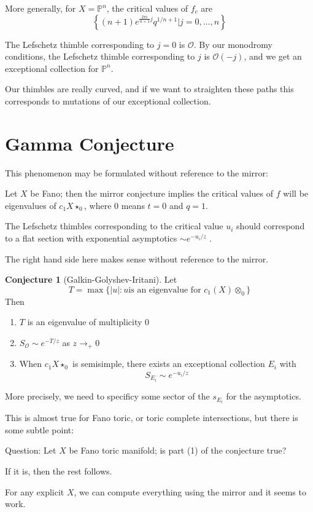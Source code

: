 \documentclass{amsart}
\theoremstyle{definition}
\newtheorem{conjecture}[dummy]{Conjecture}
\newcommand{\OO}{\mathcal{O}}
\newcommand{\proj}{\mathbb{P}}
\begin{document}
More generally, for $X=\proj^n$, the critical values of $f_c$ are 
$$\left\{(n+1)e^{\frac{2\pi i}{n+1} j}q^{1/n+1}| j=0,\dots, n\right\}$$

The Lefschetz thimble corresponding to $j=0$ is $\OO$.
By our monodromy conditions, the Lefschetz thimble corresponding to $j$ is $\OO(-j)$, and we get an exceptional collection for $\proj^n$.  

Our thimbles are really curved, and if we want to straighten these paths this corresponds to mutations of our exceptional collection.

\section{Gamma Conjecture}
This phenomenon may be formulated without reference to the mirror:


Let $X$ be Fano; then the mirror conjecture implies the critical values of $f$ will be eigenvalues of $c_1X\star_0$, where $0$ means $t=0$ and $q=1$.

The Lefschetz thimbles corresponding to the critical value $u_i$ should correspond to a flat section with exponential asymptotics $\sim e^{-u_i/z}$ .

The right hand side here makes sense without reference to the mirror.
\begin{conjecture}[Galkin-Golyshev-Iritani]
Let 
$$T=\max\{ |u|: u \text{is an eigenvalue for } c_1(X)\otimes_0\}$$
Then 
\begin{enumerate}

\item $T$ is an eigenvalue of multiplicity 0
\item $S_\OO\sim e^{-T/z}$ as $z\to_{+} 0$
\item When $c_1X\star_0$ is semisimple, there exists an exceptional collection $E_i$ with 
$$S_{E_i}\sim e^{-u_i/z}$$
\end{enumerate}
\end{conjecture}
More precisely, we need to specificy some sector of the $s_{E_i}$ for the asymptotics.

This is almost true for Fano toric, or toric complete intersections, but there is some subtle point:

Question: Let $X$ be Fano toric manifold; is part (1) of the conjecture true?

If it is, then the rest follows.

For any explicit $X$, we can compute everything using the mirror and it seems to work.
\end{document}
